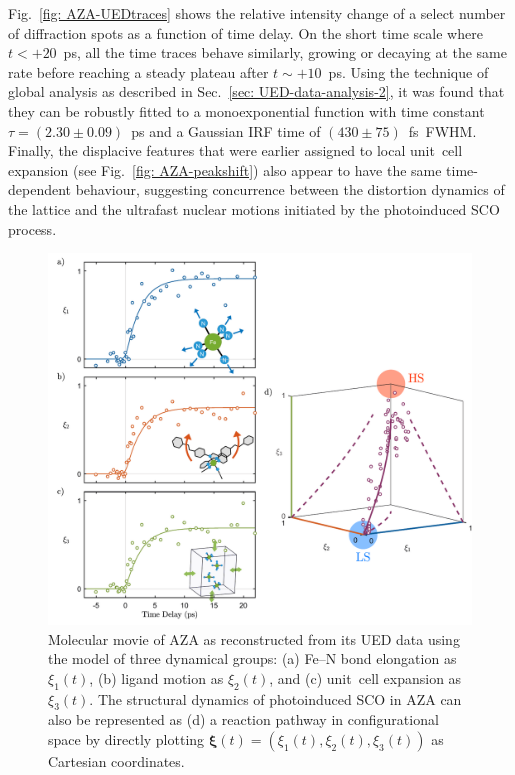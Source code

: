Fig.~\ref{fig: AZA-UEDtraces} shows the relative intensity change of
a select number of diffraction spots as a function of time delay.
On the short time scale where $t < +20$~ps,
all the time traces behave similarly, growing or decaying at the same rate
before reaching a steady plateau after $t \sim +10$~ps.
%
Using the technique of global analysis as described in Sec.~\ref{sec: UED-data-analysis-2},
it was found that they can be robustly fitted to a monoexponential function
with time constant $\tau = (2.30 \pm 0.09)$~ps
and a Gaussian IRF time of $(430 \pm 75)$~fs~FWHM.
%
Finally, the displacive features that were earlier assigned to local unit~cell expansion
(see Fig.~\ref{fig: AZA-peakshift}) also appear to have the same time-dependent behaviour,
suggesting concurrence between the distortion dynamics of the lattice
and the ultrafast nuclear motions initiated by the photoinduced SCO process.

\begin{figure}[ht!]
  \centering
  \includegraphics[width = \textwidth]{Figures/fig_AZA_molecularmovie.pdf}
  \caption[Molecular movie of AZA.]{
    Molecular movie of AZA as reconstructed from its UED data
    using the model of three dynamical groups:
    (a) Fe--N bond elongation as $\xi_1(t)$,
    (b) ligand motion as $\xi_2(t)$,
    and (c) unit~cell expansion as $\xi_3(t)$.
    The structural dynamics of photoinduced SCO in AZA
    can also be represented as (d) a reaction pathway in configurational space
    by directly plotting $\boldsymbol{\xi}(t) = (\xi_1(t), \xi_2(t), \xi_3(t))$
    as Cartesian coordinates.
  }
  \label{fig: AZA-molecularmovie}
\end{figure}

